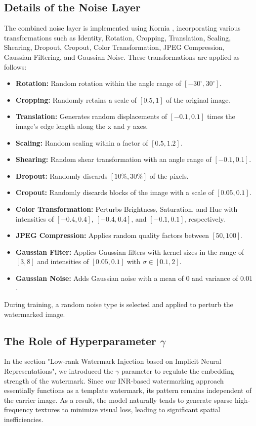 \documentclass{article}
\begin{document}
\subsection{Details of the Noise Layer}
The combined noise layer is implemented using Kornia \cite{eriba2019kornia}, incorporating various transformations such as Identity, Rotation, Cropping, Translation, Scaling, Shearing, Dropout, Cropout, Color Transformation, JPEG Compression, Gaussian Filtering, and Gaussian Noise. These transformations are applied as follows:
\begin{itemize}
    \item \textbf{Rotation:} Random rotation within the angle range of $[-30^\circ, 30^\circ]$.
    \item \textbf{Cropping:} Randomly retains a scale of $[0.5, 1]$ of the original image.
    \item \textbf{Translation:} Generates random displacements of $[-0.1, 0.1]$ times the image's edge length along the x and y axes.
    \item \textbf{Scaling:} Random scaling within a factor of $[0.5, 1.2]$.
    \item \textbf{Shearing:} Random shear transformation with an angle range of $[-0.1, 0.1]$.
    \item \textbf{Dropout:} Randomly discards $[10\%, 30\%]$ of the pixels.
    \item \textbf{Cropout:} Randomly discards blocks of the image with a scale of $[0.05, 0.1]$.
    \item \textbf{Color Transformation:} Perturbs Brightness, Saturation, and Hue with intensities of $[-0.4, 0.4]$, $[-0.4, 0.4]$, and $[-0.1, 0.1]$, respectively.
    \item \textbf{JPEG Compression:} Applies random quality factors between $[50, 100]$.
    \item \textbf{Gaussian Filter:} Applies Gaussian filters with kernel sizes in the range of $[3, 8]$ and intensities of $[0.05, 0.1]$ with $\sigma \in [0.1, 2]$.
    \item \textbf{Gaussian Noise:} Adds Gaussian noise with a mean of $0$ and variance of $0.01$.
\end{itemize}
During training, a random noise type is selected and applied to perturb the watermarked image. 

\subsection{The Role of Hyperparameter $\gamma$}
In the section "Low-rank Watermark Injection based on Implicit Neural Representations", we introduced the $\gamma$ parameter to regulate the embedding strength of the watermark. Since our INR-based watermarking approach essentially functions as a template watermark, its pattern remains independent of the carrier image. As a result, the model naturally tends to generate sparse high-frequency textures to minimize visual loss, leading to significant spatial inefficiencies.
\end{document}
